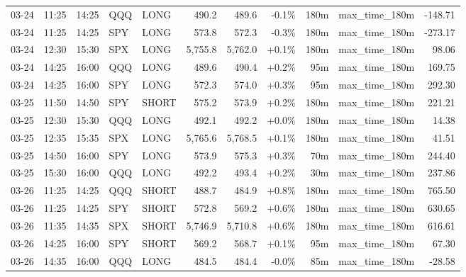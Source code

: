 \documentclass[11pt,a4paper,twoside]{article}
\begin{document}
\begin{center}
\begin{longtable}{>{\color{txtmain}}l l l l l r r r r >{\color{txtmain}}l r}
03-24 & 11:25 & 14:25 & QQQ & LONG & 490.2 & 489.6 & \textcolor{lossred}{-0.1\%} & 180m & max\_time\_180m & \textcolor{lossred}{-148.71} \\
03-24 & 11:25 & 14:25 & SPY & LONG & 573.8 & 572.3 & \textcolor{lossred}{-0.3\%} & 180m & max\_time\_180m & \textcolor{lossred}{-273.17} \\
03-24 & 12:30 & 15:30 & SPX & LONG & 5,755.8 & 5,762.0 & \textcolor{wingreen}{+0.1\%} & 180m & max\_time\_180m & \textcolor{wingreen}{98.06} \\
03-24 & 14:25 & 16:00 & QQQ & LONG & 489.6 & 490.4 & \textcolor{wingreen}{+0.2\%} & 95m & max\_time\_180m & \textcolor{wingreen}{169.75} \\
03-24 & 14:25 & 16:00 & SPY & LONG & 572.3 & 574.0 & \textcolor{wingreen}{+0.3\%} & 95m & max\_time\_180m & \textcolor{wingreen}{292.30} \\
03-25 & 11:50 & 14:50 & SPY & SHORT & 575.2 & 573.9 & \textcolor{wingreen}{+0.2\%} & 180m & max\_time\_180m & \textcolor{wingreen}{221.21} \\
03-25 & 12:30 & 15:30 & QQQ & LONG & 492.1 & 492.2 & \textcolor{wingreen}{+0.0\%} & 180m & max\_time\_180m & \textcolor{wingreen}{14.38} \\
03-25 & 12:35 & 15:35 & SPX & LONG & 5,765.6 & 5,768.5 & \textcolor{wingreen}{+0.1\%} & 180m & max\_time\_180m & \textcolor{wingreen}{41.51} \\
03-25 & 14:50 & 16:00 & SPY & LONG & 573.9 & 575.3 & \textcolor{wingreen}{+0.3\%} & 70m & max\_time\_180m & \textcolor{wingreen}{244.40} \\
03-25 & 15:30 & 16:00 & QQQ & LONG & 492.2 & 493.4 & \textcolor{wingreen}{+0.2\%} & 30m & max\_time\_180m & \textcolor{wingreen}{237.86} \\
03-26 & 11:25 & 14:25 & QQQ & SHORT & 488.7 & 484.9 & \textcolor{wingreen}{+0.8\%} & 180m & max\_time\_180m & \textcolor{wingreen}{765.50} \\
03-26 & 11:25 & 14:25 & SPY & SHORT & 572.8 & 569.2 & \textcolor{wingreen}{+0.6\%} & 180m & max\_time\_180m & \textcolor{wingreen}{630.65} \\
03-26 & 11:35 & 14:35 & SPX & SHORT & 5,746.9 & 5,710.8 & \textcolor{wingreen}{+0.6\%} & 180m & max\_time\_180m & \textcolor{wingreen}{616.61} \\
03-26 & 14:25 & 16:00 & SPY & SHORT & 569.2 & 568.7 & \textcolor{wingreen}{+0.1\%} & 95m & max\_time\_180m & \textcolor{wingreen}{67.30} \\
03-26 & 14:35 & 16:00 & QQQ & LONG & 484.5 & 484.4 & \textcolor{lossred}{-0.0\%} & 85m & max\_time\_180m & \textcolor{lossred}{-28.58} \\

\end{longtable}
\end{center}
\end{document}
